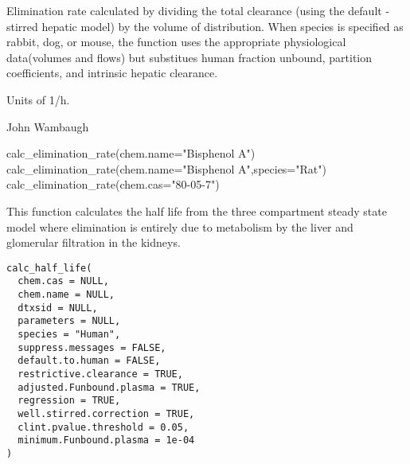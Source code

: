 \documentclass[a4paper]{book}
\begin{document}
%
\begin{Details}\relax
Elimination rate calculated by dividing the total clearance (using the
default -stirred hepatic model) by the volume of distribution. When
species is specified as rabbit, dog, or mouse, the function uses the
appropriate physiological data(volumes and flows) but substitues human
fraction unbound, partition coefficients, and intrinsic hepatic clearance.
\end{Details}
%
\begin{Value}
\begin{ldescription}
\item[\code{Elimination rate}] Units of 1/h.
\end{ldescription}
\end{Value}
%
\begin{Author}\relax
John Wambaugh
\end{Author}
%
\begin{Examples}
\begin{ExampleCode}

calc_elimination_rate(chem.name="Bisphenol A")
calc_elimination_rate(chem.name="Bisphenol A",species="Rat")
calc_elimination_rate(chem.cas="80-05-7")

\end{ExampleCode}
\end{Examples}
%
\begin{Description}\relax
This function calculates the half life from the three compartment
steady state model where elimination is entirely due to metabolism by the
liver and glomerular filtration in the kidneys.
\end{Description}
%
\begin{Usage}
\begin{verbatim}
calc_half_life(
  chem.cas = NULL,
  chem.name = NULL,
  dtxsid = NULL,
  parameters = NULL,
  species = "Human",
  suppress.messages = FALSE,
  default.to.human = FALSE,
  restrictive.clearance = TRUE,
  adjusted.Funbound.plasma = TRUE,
  regression = TRUE,
  well.stirred.correction = TRUE,
  clint.pvalue.threshold = 0.05,
  minimum.Funbound.plasma = 1e-04
)
\end{verbatim}
\end{Usage}
%
\end{document}
